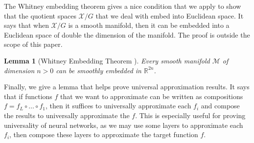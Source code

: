 \documentclass{article} \usepackage{iclr2023_conference,times}
\newcommand{\RR}{\mathbb R}
\newcommand{\mc}[1]{\mathcal{#1}}
\newtheorem{lemma}{Lemma}
\begin{document}
The Whitney embedding theorem gives a nice condition that we apply to show that the quotient spaces $\mc X / G$ that we deal with embed into Euclidean space. It says that when $\mc X / G$ is a smooth manifold, then it can be embedded into a Euclidean space of double the dimension of the manifold. The proof is outside the scope of this paper.
\begin{lemma}[Whitney Embedding Theorem \citep{whitney1944self}]\label{lem:whitney}
    Every smooth manifold $\mc M$ of dimension $n > 0$ can be smoothly embedded in $\RR^{2n}$.
\end{lemma}

Finally, we give a lemma that helps prove universal approximation results. It says that if functions $f$ that we want to approximate can be written as compositions $f = f_L \circ \ldots \circ f_1$, then it suffices to universally approximate each $f_i$ and compose the results to universally approximate the $f$. This is especially useful for proving universality of neural networks, as we may use some layers to approximate each $f_i$, then compose these layers to approximate the target function $f$.
\end{document}
